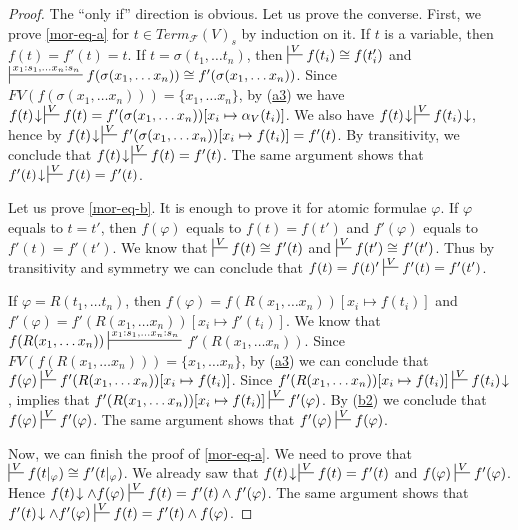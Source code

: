 \documentclass[reqno]{amsart}
\newcommand{\axref}[1]{(\hyperref[ax:#1]{#1})}
\theoremstyle{definition}
\theoremstyle{remark}
\numberwithin{figure}{section}
\begin{document}
\begin{proof}
The ``only if'' direction is obvious.
Let us prove the converse.
First, we prove \eqref{mor-eq-a} for $t \in Term_\mathcal{F}(V)_s$ by induction on it.
If $t$ is a variable, then $f(t) = f'(t) = t$.
If $t = \sigma(t_1, \ldots t_n)$, then $\sststile{}{V} f(t_i) \cong f(t'_i)$
and $\sststile{}{x_1 : s_1, \ldots x_n : s_n} f(\sigma(x_1, \ldots x_n)) \cong f'(\sigma(x_1, \ldots x_n))$.
Since $FV(f(\sigma(x_1, \ldots x_n))) = \{ x_1, \ldots x_n\}$, by \axref{a3} we have
$f(t)\!\downarrow\,\sststile{}{V} f(t) = f'(\sigma(x_1, \ldots x_n))[x_i \mapsto \alpha_V(t_i)]$.
We also have $f(t)\!\downarrow\,\sststile{}{V} f(t_i)\!\downarrow$, hence by 
$f(t)\!\downarrow\,\sststile{}{V} f'(\sigma(x_1, \ldots x_n))[x_i \mapsto f(t_i)] = f'(t)$.
By transitivity, we conclude that $f(t)\!\downarrow\,\sststile{}{V} f(t) = f'(t)$.
The same argument shows that $f'(t)\!\downarrow\,\sststile{}{V} f(t) = f'(t)$.

Let us prove \eqref{mor-eq-b}.
It is enough to prove it for atomic formulae $\varphi$.
If $\varphi$ equals to $t = t'$, then $f(\varphi)$ equals to $f(t) = f(t')$ and $f'(\varphi)$ equals to $f'(t) = f'(t')$.
We know that $\sststile{}{V} f(t) \cong f'(t)$ and $\sststile{}{V} f(t') \cong f'(t')$.
Thus by transitivity and symmetry we can conclude that $f(t) = f(t)' \sststile{}{V} f'(t) = f'(t')$.

If $\varphi = R(t_1, \ldots t_n)$, then $f(\varphi) = f(R(x_1, \ldots x_n))[x_i \mapsto f(t_i)]$
and $f'(\varphi) = f'(R(x_1, \ldots x_n))[x_i \mapsto f'(t_i)]$.
We know that $f(R(x_1, \ldots x_n)) \sststile{}{x_1 : s_1, \ldots x_n : s_n}$ \linebreak $f'(R(x_1, \ldots x_n))$.
Since $FV(f(R(x_1, \ldots x_n))) = \{ x_1, \ldots x_n \}$, by \axref{a3} we can conclude that $f(\varphi) \sststile{}{V} f'(R(x_1, \ldots x_n))[x_i \mapsto f(t_i)]$.
Since $f'(R(x_1, \ldots x_n))[x_i \mapsto f(t_i)] \sststile{}{V} f(t_i)\!\downarrow$,  implies that
$f'(R(x_1, \ldots x_n))[x_i \mapsto f(t_i)] \sststile{}{V} f'(\varphi)$.
By \axref{b2} we conclude that $f(\varphi) \sststile{}{V} f'(\varphi)$.
The same argument shows that $f'(\varphi) \sststile{}{V} f(\varphi)$.

Now, we can finish the proof of \eqref{mor-eq-a}.
We need to prove that $\sststile{}{V} f(t|_\varphi) \cong f'(t|_\varphi)$.
We already saw that $f(t)\!\downarrow\,\sststile{}{V} f(t) = f'(t)$ and $f(\varphi) \sststile{}{V} f'(\varphi)$.
Hence $f(t)\!\downarrow \land f(\varphi) \sststile{}{V} f(t) = f'(t) \land f'(\varphi)$.
The same argument shows that $f'(t)\!\downarrow \land f'(\varphi) \sststile{}{V} f(t) = f'(t) \land f(\varphi)$.
\end{proof}
\end{document}
